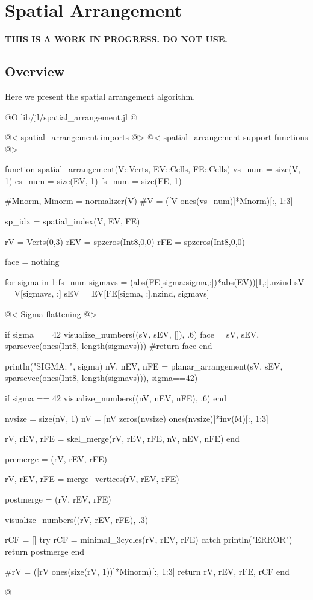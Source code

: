 \chapter{Spatial Arrangement}

\textbf{THIS IS A WORK IN PROGRESS. DO NOT USE.}

\section{Overview}
Here we present the spatial arrangement algorithm. 

@O lib/jl/spatial_arrangement.jl
@{@< spatial\_arrangement imports @>
@< spatial\_arrangement support functions @>

function spatial_arrangement(V::Verts, EV::Cells, FE::Cells)
    vs_num = size(V, 1)
    es_num = size(EV, 1)
    fs_num = size(FE, 1)

    #Mnorm, Minorm = normalizer(V)
    #V = ([V ones(vs_num)]*Mnorm)[:, 1:3]
    
    sp_idx = spatial_index(V, EV, FE)

    rV = Verts(0,3)
    rEV = spzeros(Int8,0,0)
    rFE = spzeros(Int8,0,0)

    face = nothing

    for sigma in 1:fs_num
        sigmavs = (abs(FE[sigma:sigma,:])*abs(EV))[1,:].nzind 
        sV = V[sigmavs, :]
        sEV = EV[FE[sigma, :].nzind, sigmavs]

        @< Sigma flattening @>

        if sigma == 42
            visualize_numbers((sV, sEV, []), .6)
            face = sV, sEV, sparsevec(ones(Int8, length(sigmavs)))
            #return face
        end

        println("SIGMA: ", sigma)
        nV, nEV, nFE = planar_arrangement(sV, sEV, sparsevec(ones(Int8, length(sigmavs))), sigma==42)

        if sigma == 42
            visualize_numbers((nV, nEV, nFE), .6)
        end

        nvsize = size(nV, 1)
        nV = [nV zeros(nvsize) ones(nvsize)]*inv(M)[:, 1:3]

        rV, rEV, rFE = skel_merge(rV, rEV, rFE, nV, nEV, nFE)
    end

    premerge = (rV, rEV, rFE)

    rV, rEV, rFE = merge_vertices(rV, rEV, rFE)

    postmerge = (rV, rEV, rFE)
    
    visualize_numbers((rV, rEV, rFE), .3)

    rCF = []
    try
        rCF = minimal_3cycles(rV, rEV, rFE)
    catch
        println("ERROR")
        return postmerge
    end

    #rV = ([rV ones(size(rV, 1))]*Minorm)[:, 1:3]
    return rV, rEV, rFE, rCF
end

@}

